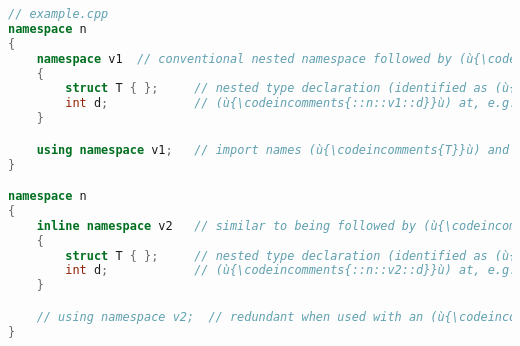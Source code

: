 \begin{lstlisting}[language=C++]
// example.cpp
namespace n
{
    namespace v1  // conventional nested namespace followed by (ù{\codeincomments{using}}ù) directive
    {
        struct T { };     // nested type declaration (identified as (ù{\codeincomments{::n::v1::T}}ù))
        int d;            // (ù{\codeincomments{::n::v1::d}}ù) at, e.g., (ù{\codeincomments{0x01a64e90}}ù)
    }

    using namespace v1;   // import names (ù{\codeincomments{T}}ù) and (ù{\codeincomments{d}}ù) into (ù{\codeincomments{namespace n}}ù)
}

namespace n
{
    inline namespace v2   // similar to being followed by (ù{\codeincomments{using namespace v2}}ù)
    {
        struct T { };     // nested type declaration (identified as (ù{\codeincomments{::n::v2::T}}ù))
        int d;            // (ù{\codeincomments{::n::v2::d}}ù) at, e.g., (ù{\codeincomments{0x01a64e94}}ù)
    }

    // using namespace v2;  // redundant when used with an (ù{\codeincomments{inline namespace}}ù)
}
\end{lstlisting}

